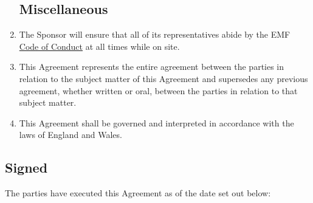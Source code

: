 \begin{enumerate}
\subsection*{Miscellaneous}

\item The Sponsor will ensure that all of its representatives abide by the EMF
        \href{https://www.emfcamp.org/code-of-conduct}{Code of Conduct} at all times while on site.

\item This Agreement represents the entire agreement between the parties in relation to the subject
        matter of this Agreement and supersedes any previous agreement, whether written or oral,
        between the parties in relation to that subject matter.
\item This Agreement shall be governed and interpreted in accordance with the laws of England and Wales.

\end{enumerate}


\subsection*{Signed}
The parties have executed this Agreement as of the date set out below:



\newpage





